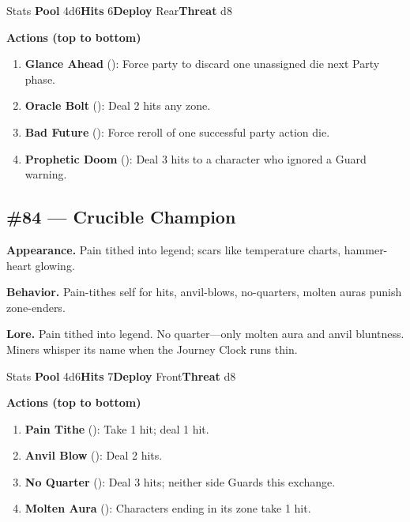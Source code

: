 \begin{monsterentry}{Stats}
\textbf{Pool} 4d6\quad\textbf{Hits} 6\quad\textbf{Deploy} Rear\quad\textbf{Threat} d8

\textbf{Actions (top to bottom)}
\begin{enumerate}\setlength{\itemsep}{0.15em}\setlength{\parskip}{0pt}
  \item \textbf{Glance Ahead} (\easy): Force party to discard one unassigned die next Party phase.
  \item \textbf{Oracle Bolt} (\medium): Deal 2 hits any zone.
  \item \textbf{Bad Future} (\hard): Force reroll of one successful party action die.
  \item \textbf{Prophetic Doom} (\hard): Deal 3 hits to a character who ignored a Guard warning.
\end{enumerate}
\end{monsterentry}

\subsection*{\#84 --- Crucible Champion}

\textbf{Appearance.} Pain tithed into legend; scars like temperature charts, hammer-heart glowing.

\textbf{Behavior.} Pain-tithes self for hits, anvil-blows, no-quarters, molten auras punish zone-enders.

\textbf{Lore.} Pain tithed into legend. No quarter---only molten aura and anvil bluntness. Miners whisper its name when the Journey Clock runs thin.

\begin{monsterentry}{Stats}
\textbf{Pool} 4d6\quad\textbf{Hits} 7\quad\textbf{Deploy} Front\quad\textbf{Threat} d8

\textbf{Actions (top to bottom)}
\begin{enumerate}\setlength{\itemsep}{0.15em}\setlength{\parskip}{0pt}
  \item \textbf{Pain Tithe} (\easy): Take 1 hit; deal 1 hit.
  \item \textbf{Anvil Blow} (\medium): Deal 2 hits.
  \item \textbf{No Quarter} (\hard): Deal 3 hits; neither side Guards this exchange.
  \item \textbf{Molten Aura} (\medium): Characters ending in its zone take 1 hit.
\end{enumerate}
\end{monsterentry}


